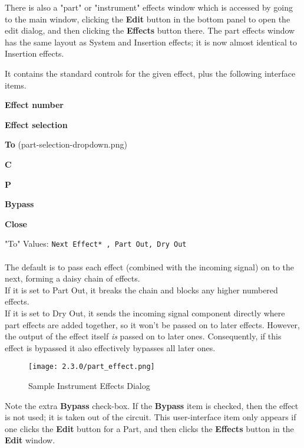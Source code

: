    There is also a "part" or "instrument" effects window which is accessed
   by going to the main window, clicking the \textbf{Edit} button in the
   bottom panel to open the edit dialog, and then clicking the
   \textbf{Effects} button there.  The part effects window has the
   same layout as System and Insertion effects; it is now almost identical
   to Insertion effects.

   It contains the standard controls for the given effect, plus the
   following interface items.

   \begin{enumber}
      \item \textbf{Effect number}
      \item \textbf{Effect selection}
      \item \textbf{To} (part-selection-dropdown.png)
      \item \textbf{C}
      \item \textbf{P}
      \item \textbf{Bypass}
      \item \textbf{Close}
   \end{enumber}

   "To" Values: \texttt{Next Effect* , Part Out, Dry Out}\\
   \\
   The default is to pass each effect (combined with the incoming signal) on to the next,
   forming a daisy chain of effects.\\
   If it is set to Part Out, it breaks the chain and blocks any higher numbered effects.\\
   If it is set to Dry Out, it sends the incoming signal component directly where part
   effects are added together, so it won't be passed on to later effects. However, the
   output of the effect itself \textsl{is} passed on to later ones. Consequently, if this
   effect is bypassed it also effectively bypasses all later ones.

\begin{figure}[H]
   \centering
   \texttt{[image: 2.3.0/part\_effect.png]}
   \caption{Sample Instrument Effects Dialog}
   \label{fig:sample_instrument_effects_dialog}
\end{figure}

   Note the extra \textbf{Bypass} check-box.  If the \textbf{Bypass} item is
   checked, then the effect is not used; it is taken out of the circuit.  This
   user-interface item only appears if one clicks the \textbf{Edit} button for
   a Part, and then clicks the \textbf{Effects} button in the \textbf{Edit}
   window.

